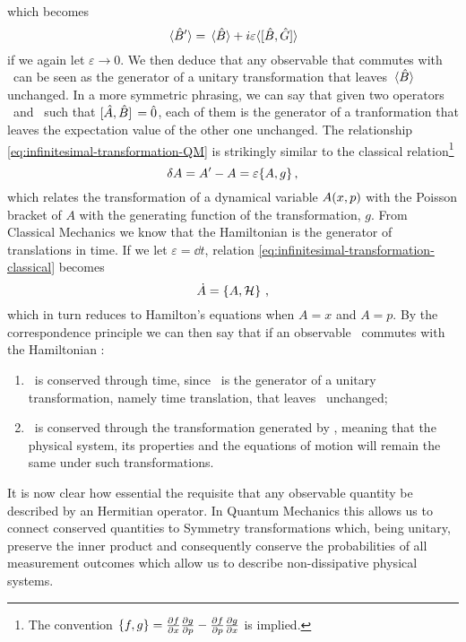             which becomes
            \begin{equation}
                \label{eq:infinitesimal-transformation-QM}
                \expval*{\hB'} = \expval*{\hB} + i\varepsilon\!\expval*{\comm*{\hB}{\hG}\!}
            \end{equation}
            if we again let $\varepsilon \to 0$. We then deduce that any observable that commutes with \hB\ can be seen as the generator of a unitary transformation that leaves $\expval*{\hat{B}}$ unchanged. In a more symmetric phrasing, we can say that given two operators \hA\ and \hB\ such that $\comm*{\hA}{\hB} = \hzero$, each of them is the generator of a tranformation that leaves the expectation value of the other one unchanged. The relationship \eqref{eq:infinitesimal-transformation-QM} is strikingly similar to the classical relation\footnote{The convention $\acomm{f}{g} = \pdv{f}{x}\pdv{g}{p} - \pdv{f}{p}\pdv{g}{x}$ is implied.} \cite{Goldstein2005-ep}
            \begin{equation}
                \label{eq:infinitesimal-transformation-classical}
                \var{A} = A' - A = \varepsilon\acomm{A}{g}
                \mycomma
            \end{equation}
            which relates the transformation of a dynamical variable $A\pqty{x,p}$ with the Poisson bracket of $A$ with the generating function of the transformation, $g$. From Classical Mechanics \cite{Goldstein2005-ep} we know that the Hamiltonian is the generator of translations in time. If we let $\varepsilon = \dd{t}$, relation \eqref{eq:infinitesimal-transformation-classical} becomes
            \begin{equation*}
                \dot{A} = \acomm*{A}{\mcH}
                \mycomma
            \end{equation*}
            which in turn reduces to Hamilton's equations when $A = x$ and $A = p$. By the correspondence principle we can then say that if an observable \hA\ commutes with the Hamiltonian \hH :
            \begin{enumerate}[label = \mybullet]
                \item \hA\ is conserved through time, since \hH\ is the generator of a unitary transformation, namely time translation, that leaves \hA\ unchanged;
                \item \hH\ is conserved through the transformation generated by \hA, meaning that the physical system, its properties and the equations of motion will remain the same under such transformations.
            \end{enumerate}
            It is now clear how essential the requisite that any observable quantity be described by an Hermitian operator. In Quantum Mechanics this allows us to connect conserved quantities to Symmetry transformations which, being unitary, preserve the inner product and consequently conserve the probabilities of all measurement outcomes which allow us to describe non-dissipative physical systems.


